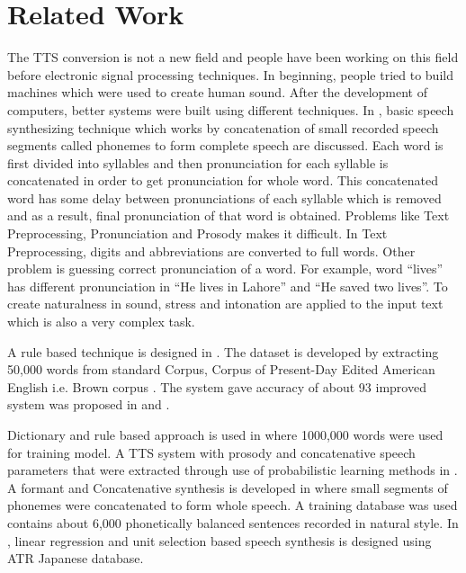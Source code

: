 \chapter{Related Work}

The TTS conversion is not a new field and people have been working on this field before electronic
signal processing techniques. In beginning, people tried to build machines which were used to
create human sound. After the development of computers, better systems were built using different
techniques. In \cite{swetha2013text}, basic speech synthesizing technique
which works by concatenation of small recorded speech segments called phonemes to form
complete speech are discussed. Each word is first divided into syllables and then pronunciation for each syllable
is concatenated in order to get pronunciation for whole word. This concatenated word has some
delay between pronunciations of each syllable which is removed and as a result, final
pronunciation of that word is obtained. Problems like Text Preprocessing, Pronunciation and
Prosody makes it difficult. In Text Preprocessing, digits and abbreviations are converted to full
words. Other problem is guessing correct pronunciation of a word. For example, word “lives” has
different pronunciation in “He lives in Lahore” and “He saved two lives”. To create naturalness in
sound, stress and intonation are applied to the input text which is also a very complex task.


A rule based technique is designed in \cite{elovitz1976automatic}. The dataset is developed by extracting
50,000 words from standard Corpus, Corpus of Present-Day Edited American English i.e. Brown
corpus \cite{ku1967computational}. The system gave accuracy of about 93%
improved system was proposed in \cite{carlson1982multi} and \cite{klatt1982klattalk}.


Dictionary and rule based approach is used in \cite{liberman1992text} where 1000,000 words were used for training model. A TTS system with
prosody and concatenative speech parameters that were extracted through use of probabilistic
learning methods in \cite{huang1996whistler}. A formant and Concatenative synthesis is developed in \cite{huang1997recent}
where small segments of phonemes were concatenated to form whole speech. A training database
was used contains about 6,000 phonetically balanced sentences recorded in natural style. In \cite{hunt1996unit}, linear regression and unit selection 
based speech synthesis is designed using ATR Japanese database.


